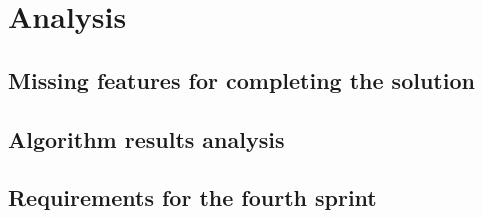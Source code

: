 \section{Analysis}

\subsection{Missing features for completing the solution}

\subsection{Algorithm results analysis}


\subsection{Requirements for the fourth sprint}
